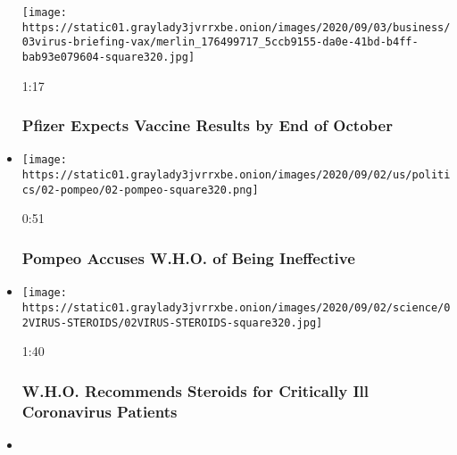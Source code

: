 \begin{itemize}
  \texttt{[image: https://static01.graylady3jvrrxbe.onion/images/2020/09/03/business/03virus-briefing-vax/merlin\_176499717\_5ccb9155-da0e-41bd-b4ff-bab93e079604-square320.jpg]}

  1:17

  \hypertarget{pfizer-expects-vaccine-results-by-end-of-october}{%
  \subsubsection{Pfizer Expects Vaccine Results by End of
  October}\label{pfizer-expects-vaccine-results-by-end-of-october}}
\item
  \href{https://www.nytimes3xbfgragh.onion/video/us/politics/100000007320987/pompeo-who-coronavirus-vaccine.html?action=click\&module=video-series-bar\&region=header\&pgtype=Article\&playlistId=video/coronavirus-news-update}{}

  \texttt{[image: https://static01.graylady3jvrrxbe.onion/images/2020/09/02/us/politics/02-pompeo/02-pompeo-square320.png]}

  0:51

  \hypertarget{pompeo-accuses-who-of-being-ineffective}{%
  \subsubsection{Pompeo Accuses W.H.O. of Being
  Ineffective}\label{pompeo-accuses-who-of-being-ineffective}}
\item
  \href{https://www.nytimes3xbfgragh.onion/video/world/europe/100000007320740/who-steroid-guidelines-coronavirus.html?action=click\&module=video-series-bar\&region=header\&pgtype=Article\&playlistId=video/coronavirus-news-update}{}

  \texttt{[image: https://static01.graylady3jvrrxbe.onion/images/2020/09/02/science/02VIRUS-STEROIDS/02VIRUS-STEROIDS-square320.jpg]}

  1:40

  \hypertarget{who-recommends-steroids-for-critically-ill-coronavirus-patients}{%
  \subsubsection{W.H.O. Recommends Steroids for Critically Ill
  Coronavirus
  Patients}\label{who-recommends-steroids-for-critically-ill-coronavirus-patients}}
\item
  \href{https://www.nytimes3xbfgragh.onion/video/us/politics/100000007319385/mnuchin-economy-recovery.html?action=click\&module=video-series-bar\&region=header\&pgtype=Article\&playlistId=video/coronavirus-news-update}{}


\end{itemize}

